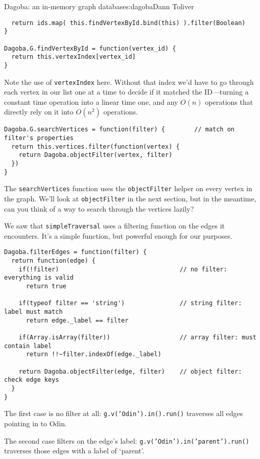 \begin{aosachapter}{Dagoba: an in-memory graph database}{s:dagoba}{Dann Toliver}
\begin{verbatim}
  return ids.map( this.findVertexById.bind(this) ).filter(Boolean)
}

Dagoba.G.findVertexById = function(vertex_id) {
  return this.vertexIndex[vertex_id]
}
\end{verbatim}

Note the use of \texttt{vertexIndex} here. Without that index we'd have
to go through each vertex in our list one at a time to decide if it
matched the ID---turning a constant time operation into a linear time
one, and any $O(n)$ operations that directly rely on it into $O(n^2)$
operations.

\begin{verbatim}
Dagoba.G.searchVertices = function(filter) {        // match on filter's properties
  return this.vertices.filter(function(vertex) {
    return Dagoba.objectFilter(vertex, filter)
  })
}
\end{verbatim}

The \texttt{searchVertices} function uses the \texttt{objectFilter}
helper on every vertex in the graph. We'll look at \texttt{objectFilter}
in the next section, but in the meantime, can you think of a way to
search through the vertices lazily?

\label{filtering}

We saw that \texttt{simpleTraversal} uses a filtering function on the
edges it encounters. It's a simple function, but powerful enough for our
purposes.

\begin{verbatim}
Dagoba.filterEdges = function(filter) {
  return function(edge) {
    if(!filter)                                 // no filter: everything is valid
      return true

    if(typeof filter == 'string')               // string filter: label must match
      return edge._label == filter

    if(Array.isArray(filter))                   // array filter: must contain label
      return !!~filter.indexOf(edge._label)

    return Dagoba.objectFilter(edge, filter)    // object filter: check edge keys
  }
}
\end{verbatim}

The first case is no filter at all: \texttt{g.v('Odin').in().run()}
traverses all edges pointing in to Odin.

The second case filters on the edge's label:
\texttt{g.v('Odin').in('parent').run()} traverses those edges with a
label of `parent'.


\end{aosachapter}
